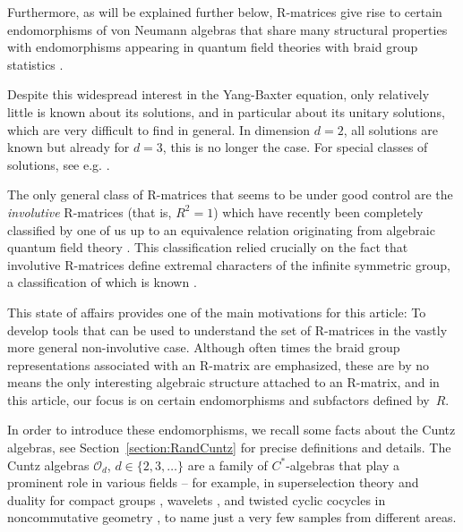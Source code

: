 \documentclass[12pt,a4paper]{amsart}
\numberwithin{equation}{section}
\theoremstyle{remark}
\newcommand{\CO}[0]{\mathcal{O}} \newcommand{\CP}[0]{\mathcal{P}}
\begin{document}
Furthermore, as will be explained further below, R-matrices give rise to certain endomorphisms of von Neumann algebras that share many structural properties with endomorphisms appearing in quantum field theories with braid group statistics \cite{Frohlich:1988_3,FredenhagenRehrenSchroer:1989,Longo:1992}.

\medskip

Despite this widespread interest in the Yang-Baxter equation, only relatively little is known about its solutions, and in particular about its unitary solutions, which are very difficult to find in general. In dimension $d=2$, all solutions are known \cite{Hietarinta:1992_8} but already for $d=3$, this is no longer the case. For special classes of solutions, see e.g. \cite{GoldschmidtJones:1989,Bytsko:2019}.

The only general class of R-matrices that seems to be under good control are the {\em involutive} R-matrices (that is, $R^2=1$) which have recently been completely classified by one of us \cite{LechnerPennigWood:2019} up to an equivalence relation originating from algebraic quantum field theory \cite{AlazzawiLechner:2016}. This classification relied crucially on the fact that involutive R-matrices define extremal characters of the infinite symmetric group, a classification of which is known \cite{Thoma:1964}.

This state of affairs provides one of the main motivations for this article: To develop tools that can be used to understand the set of R-matrices in the vastly more general non-involutive case. Although often times the braid group representations associated with an R-matrix are emphasized, these are by no means the only interesting algebraic structure attached to an R-matrix, and in this article, our focus is on certain endomorphisms and subfactors defined by~$R$. 

\medskip

In order to introduce these endomorphisms, we recall some facts about the Cuntz algebras, see Section~\ref{section:RandCuntz} for precise definitions and details. The Cuntz algebras $\CO_d$, $d\in\{2,3,\ldots\}$ \cite{Cuntz:1977} are a family of $C^*$-algebras that play a prominent role in various fields -- for example, in superselection theory and duality for compact groups \cite{DoplicherRoberts:1987}, wavelets \cite{BratteliJorgensen:1999}, and twisted cyclic cocycles in noncommutative geometry \cite{CareyPhillipsRennie:2008_2}, to name just a very few samples from different areas.
\end{document}
